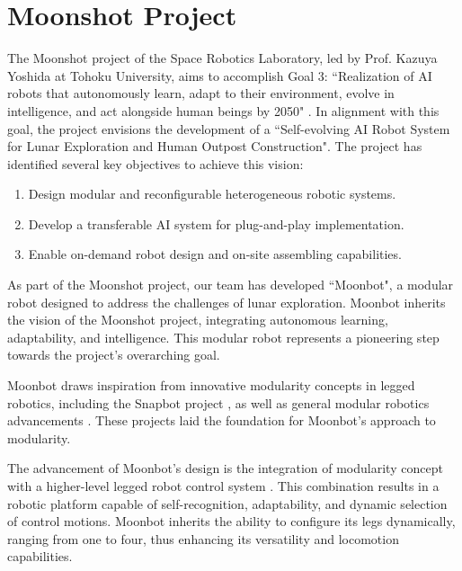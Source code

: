 
\section{Moonshot Project}
The Moonshot project of the Space Robotics Laboratory, led by Prof. Kazuya Yoshida at Tohoku University, aims to accomplish Goal 3: ``Realization of AI robots that autonomously learn, adapt to their environment, evolve in intelligence, and act alongside human beings by 2050" \cite{moonshotproject}. In alignment with this goal, the project envisions the development of a ``Self-evolving AI Robot System for Lunar Exploration and Human Outpost Construction"\cite{moonshotGoal3B}. The project has identified several key objectives to achieve this vision:
\vspace{1mm}
\begin{enumerate}
    \item Design modular and reconfigurable heterogeneous robotic systems.
    \item Develop a transferable AI system for plug-and-play implementation.
    \item Enable on-demand robot design and on-site assembling capabilities.
\end{enumerate}

As part of the Moonshot project, our team has developed ``Moonbot", a modular robot designed to address the challenges of lunar exploration. Moonbot inherits the vision of the Moonshot project, integrating autonomous learning, adaptability, and intelligence. This modular robot represents a pioneering step towards the project's overarching goal.

Moonbot draws inspiration from innovative modularity concepts in legged robotics, including the Snapbot project \cite{snapbot1} \cite{snapbot2}, as well as general modular robotics advancements \cite{modularrobot}. These projects laid the foundation for Moonbot's approach to modularity.

The advancement of Moonbot's design is the integration of modularity concept with a higher-level legged robot control system \cite{syropod}. This combination results in a robotic platform capable of self-recognition, adaptability, and dynamic selection of control motions. Moonbot inherits the ability to configure its legs dynamically, ranging from one to four, thus enhancing its versatility and locomotion capabilities.\\


